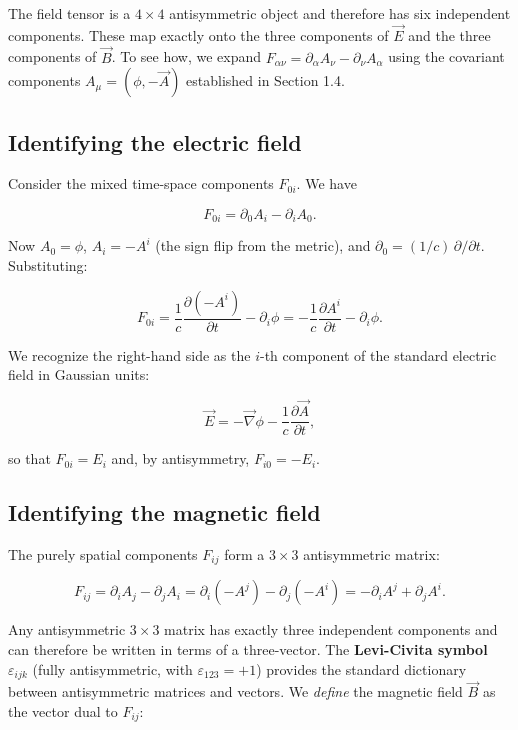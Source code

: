 The field tensor is a $4\times 4$ antisymmetric object and therefore has six independent components. These map exactly onto the three components of $\vec{E}$ and the three components of $\vec{B}$. To see how, we expand $F_{\alpha\nu} = \partial_\alpha A_\nu - \partial_\nu A_\alpha$ using the covariant components $A_\mu = (\phi, -\vec{A})$ established in Section 1.4.

\subsection*{Identifying the electric field}

Consider the mixed time-space components $F_{0i}$. We have

\begin{equation}
F_{0i} = \partial_0 A_i - \partial_i A_0.
\end{equation}

Now $A_0 = \phi$, $A_i = -A^i$ (the sign flip from the metric), and $\partial_0 = (1/c)\,\partial/\partial t$. Substituting:

\begin{equation}
F_{0i} = \frac{1}{c}\frac{\partial(-A^i)}{\partial t} - \partial_i \phi = -\frac{1}{c}\frac{\partial A^i}{\partial t} - \partial_i \phi.
\end{equation}

We recognize the right-hand side as the $i$-th component of the standard electric field in Gaussian units:

\begin{equation}
\boxed{\vec{E} = -\vec{\nabla}\phi - \frac{1}{c}\frac{\partial \vec{A}}{\partial t},}
\end{equation}

so that $F_{0i} = E_i$ and, by antisymmetry, $F_{i0} = -E_i$.

\subsection*{Identifying the magnetic field}

The purely spatial components $F_{ij}$ form a $3\times 3$ antisymmetric matrix:

\begin{equation}
F_{ij} = \partial_i A_j - \partial_j A_i = \partial_i(-A^j) - \partial_j(-A^i) = -\partial_i A^j + \partial_j A^i.
\end{equation}

Any antisymmetric $3\times 3$ matrix has exactly three independent components and can therefore be written in terms of a three-vector. The \textbf{Levi-Civita symbol} $\varepsilon_{ijk}$ (fully antisymmetric, with $\varepsilon_{123} = +1$) provides the standard dictionary between antisymmetric matrices and vectors. We \emph{define} the magnetic field $\vec{B}$ as the vector dual to $F_{ij}$:

